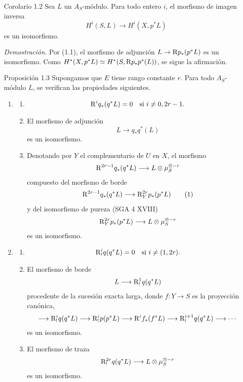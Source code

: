 \begin{statement}{Corolario 1.2}
Sea $L$ un $A_S$-módulo. Para todo entero $i$, el morfismo de imagen inversa
\[
H^i(S,L)\longrightarrow H^i(X,p^*L)
\]
es un isomorfismo.
\end{statement}

\emph{Demostración.} Por (1.1), el morfismo de adjunción $L\to \mathrm{R} p_*(p^*L)$ es un isomorfismo. Como $H^*(X,p^*L)\simeq H^*(S,\mathrm{R} p_*p^*(L))$, se sigue la afirmación.

\begin{statement}{Proposición 1.3}
Supongamos que $E$ tiene rango constante $r$. Para todo $A_S$-módulo $L$, se verifican las propiedades siguientes.
\begin{enumerate}[label=(\roman*)]
\item
\begin{enumerate}[label=\alph*)]
\item
\[
\mathrm{R}^i q_*(q^*L)=0\quad\text{si }i\ne 0,2r-1.
\]
\item El morfismo de adjunción
\[
L\longrightarrow q_*q^*(L)
\]
es un isomorfismo.
\item Denotando por $Y$ el complementario de $U$ en $X$, el morfismo
\[
\mathrm{R}^{2r-1}q_*(q^*L)\longrightarrow L\otimes\mu_S^{\otimes -r}
\]
compuesto del morfismo de borde
\[
\mathrm{R}^{2r-1}q_*(q^*L)\longrightarrow \mathrm{R}_Y^{2r}p_*(p^*L)
\tag{1}
\]
y del isomorfismo de pureza (SGA 4 XVIII)
\[
\mathrm{R}_Y^{2r}p_*(p^*L)\longrightarrow L\otimes\mu_S^{\otimes -r}
\]
es un isomorfismo.
\end{enumerate}
\item
\begin{enumerate}[label=\alph*)]
\item
\[
\mathrm{R}_!^i q(q^*L)=0\quad\text{si }i\ne (1,2r).
\]
\item El morfismo de borde
\[
L\longrightarrow \mathrm{R}_!^1 q(q^*L)
\]
procedente de la sucesión exacta larga, donde $f:Y\to S$ es la proyección canónica,
\[
\longrightarrow \mathrm{R}_!^i q(q^*L)\longrightarrow \mathrm{R}_!^i p(p^*L)
\longrightarrow \mathrm{R}^i f_*(f^*L)\longrightarrow \mathrm{R}_!^{i+1}q(q^*L)\longrightarrow\cdots
\]
es un isomorfismo.
\item El morfismo de traza
\[
\mathrm{R}_!^{2r}q(q^*L)\longrightarrow L\otimes\mu_S^{\otimes -r}
\]
es un isomorfismo.
\end{enumerate}
\end{enumerate}
\end{statement}
